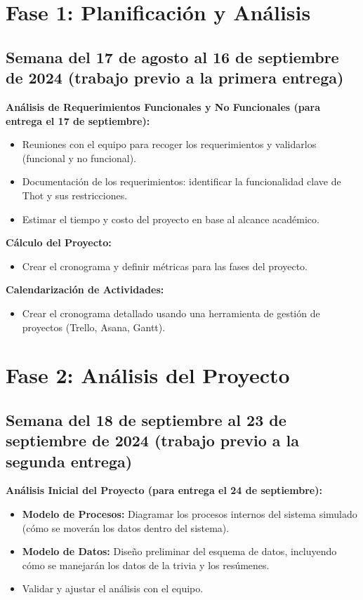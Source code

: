 \documentclass{report}
\begin{document}
    \section*{Fase 1: Planificación y Análisis}
    \subsection*{Semana del 17 de agosto al 16 de septiembre de 2024 (trabajo previo a la primera entrega)}
    \textbf{Análisis de Requerimientos Funcionales y No Funcionales (para entrega el 17 de septiembre):}
    \begin{itemize}
        \item Reuniones con el equipo para recoger los requerimientos y validarlos (funcional y no funcional).
        \item Documentación de los requerimientos: identificar la funcionalidad clave de Thot y sus restricciones.
        \item Estimar el tiempo y costo del proyecto en base al alcance académico.
    \end{itemize}
    \textbf{Cálculo del Proyecto:}
    \begin{itemize}
        \item Crear el cronograma y definir métricas para las fases del proyecto.
    \end{itemize}
    \textbf{Calendarización de Actividades:}
    \begin{itemize}
        \item Crear el cronograma detallado usando una herramienta de gestión de proyectos (Trello, Asana, Gantt).
    \end{itemize}

    \section*{Fase 2: Análisis del Proyecto}
    \subsection*{Semana del 18 de septiembre al 23 de septiembre de 2024 (trabajo previo a la segunda entrega)}
    \textbf{Análisis Inicial del Proyecto (para entrega el 24 de septiembre):}
    \begin{itemize}
        \item \textbf{Modelo de Procesos:} Diagramar los procesos internos del sistema simulado (cómo se moverán los datos dentro del sistema).
        \item \textbf{Modelo de Datos:} Diseño preliminar del esquema de datos, incluyendo cómo se manejarán los datos de la trivia y los resúmenes.
        \item Validar y ajustar el análisis con el equipo.
    \end{itemize}
\end{document}
